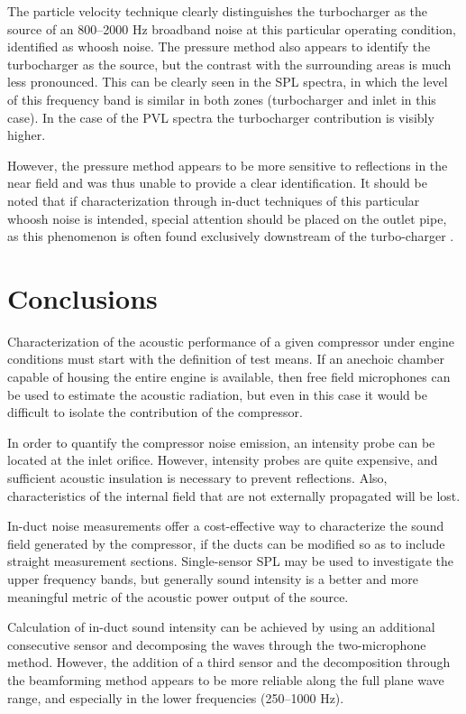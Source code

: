 The particle velocity technique clearly distinguishes the turbocharger as the source of an 800--2000 Hz broadband noise at this particular operating condition, identified as whoosh noise. The pressure method also appears to identify the turbocharger as the source, but the contrast with the surrounding areas is much less pronounced. This can be clearly seen in the SPL spectra, in which the level of this frequency band is similar in both zones (turbocharger and inlet in this case). In the case of the PVL spectra the turbocharger contribution is visibly higher.

However, the pressure method appears to be more sensitive to reflections in the near field and was thus unable to provide a clear identification. It should be noted that if characterization through in-duct techniques of this particular whoosh noise is intended, special attention should be placed on the outlet pipe, as this phenomenon is often found exclusively downstream of the turbo-charger \cite{broatch2014methodology}.

\section{Conclusions}
\label{sec:conclusions}

Characterization of the acoustic performance of a given compressor under engine conditions must start with the definition of test means. If an anechoic chamber capable of housing the entire engine is available, then free field microphones can be used to estimate the acoustic radiation, but even in this case it would be difficult to isolate the contribution of the compressor.

In order to quantify the compressor noise emission, an intensity probe can be located at the inlet orifice. However, intensity probes are quite expensive, and sufficient acoustic insulation is necessary to prevent reflections. Also, characteristics of the internal field that are not externally propagated will be lost.

In-duct noise measurements offer a cost-effective way to characterize the sound field generated by the compressor, if the ducts can be modified so as to include straight measurement sections. Single-sensor SPL may be used to investigate the upper frequency bands, but generally sound intensity is a better and more meaningful metric of the acoustic power output of the source.

Calculation of in-duct sound intensity can be achieved by using an additional consecutive sensor and decomposing the waves through the two-microphone method. However, the addition of a third sensor and the decomposition through the beamforming method appears to be more reliable along the full plane wave range, and especially in the lower frequencies (250--1000 Hz).

